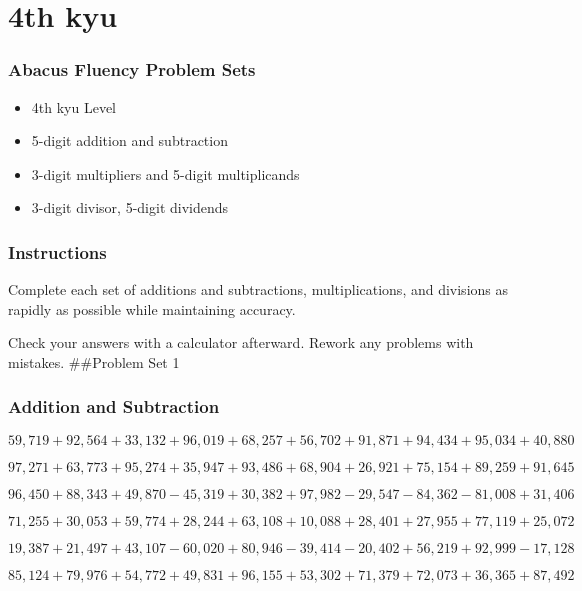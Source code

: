 \hypertarget{th-kyu-4}{%
\section{4th kyu}\label{th-kyu-4}}

\hypertarget{abacus-fluency-problem-sets-4}{%
\subsubsection{Abacus Fluency Problem
Sets}\label{abacus-fluency-problem-sets-4}}

\begin{itemize}
\item
  4th kyu Level
\item
  5-digit addition and subtraction
\item
  3-digit multipliers and 5-digit multiplicands
\item
  3-digit divisor, 5-digit dividends
\end{itemize}

\hypertarget{instructions-4}{%
\subsubsection{Instructions}\label{instructions-4}}

Complete each set of additions and subtractions, multiplications, and
divisions as rapidly as possible while maintaining accuracy.

Check your answers with a calculator afterward. Rework any problems with
mistakes. \#\#Problem Set 1

\hypertarget{addition-and-subtraction-223}{%
\subsubsection{Addition and
Subtraction}\label{addition-and-subtraction-223}}

\(59,719+92,564+33,132+96,019+68,257+56,702+91,871+94,434+95,034+ 40,880\)

\(97,271+63,773+95,274+35,947+93,486+68,904+26,921+75,154+89,259+91,645\)

\(96,450+88,343+49,870-45,319+30,382+97,982-29,547-84,362-81,008+31,406\)

\(71,255+30,053+59,774+28,244+63,108+10,088+28,401+27,955+77,119+25,072\)

\(19,387+21,497+43,107-60,020+80,946-39,414-20,402+56,219+92,999-17,128\)

\(85,124+79,976+54,772+49,831+96,155+53,302+71,379+72,073+36,365+87,492\)

